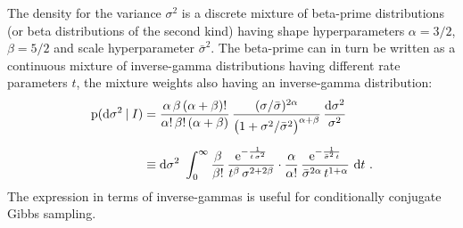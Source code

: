 \documentclass[\ifafour a4paper,12pt,\else a5paper,10pt,\fi%
onecolumn,oneside,article,%
british%
]{memoir}
\makeatletter
\theoremstyle{remark}
\theoremstyle{innote}
\def\sum{\DOTSI\sumop\slimits@}
\newcommand*{\e}{\ensuremath{\mathrm{e}}}
\newcommand*{\di}{\mathrm{d}}%
\newcommand*{\p}{\mathrm{p}}%
\renewcommand*{\|}[1][]{\nonscript\:#1\vert\nonscript\:\mathopen{}}
\newcommand*{\sect}{\S}%
\newcommand*{\sigmao}{\bar{\sigma}}
\newcommand*{\shapeh}{\alpha}
\newcommand*{\shapel}{\beta}
\makeatother
\begin{document}
\medskip

The density for the variance $\sigma^{2}$ is a discrete mixture of beta-prime distributions (or beta distributions of the second kind) \autocites[\sect\,25.7, 27.2]{johnsonetal1970b_r1995}{mcdonald1984} having shape hyperparameters $\shapeh=3/2$, $\shapel=5/2$ and scale hyperparameter $\sigmao^{2}$. The beta-prime can in turn be written as a continuous mixture of inverse-gamma distributions \autocites{dubey1970} having different rate parameters $t$, the mixture weights also having an inverse-gamma distribution:
\begin{equation}
  \label{eq:density_sigma}
  \begin{split}
    \p(\di\sigma^{2}\|I)
    &=
    \frac{\shapeh\,\shapel\, (\shapeh+\shapel)!}{\shapeh!\,\shapel!\,(\shapeh+\shapel)}
    \,\frac{(\sigma/\sigmao)^{2\shapeh}}
    {\bigl(1+\sigma^{2}/\sigmao^{2}\bigr)^{\shapeh+\shapel}}
    \,\frac{\di\sigma^{2}}{\sigma^{2}}
\\[2\jot]
  &\equiv
    \di\sigma^{2}\ 
    \int_{0}^{\infty}
    \frac{\shapel}{\shapel!}\,
    \frac{\e^{-\frac{1}{t\,\sigma^{2}}}}{
    t^{\shapel}\,\sigma^{2+2\shapel}
  }\cdot
    \frac{\shapeh}{\shapeh!}\,
    \frac{\e^{-\frac{1}{\sigmao^{2}\,t}}}{
    \sigmao^{2\shapeh}\,t^{1+\shapeh}
  }\ \di t \ .
\end{split}
\end{equation}
The expression in terms of inverse-gammas is useful for conditionally conjugate Gibbs sampling.
\end{document}
